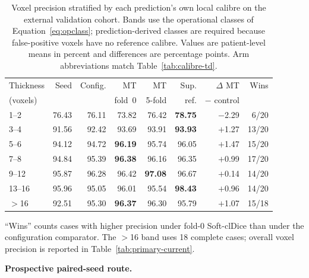 \begin{currentcontrolroute}
\begin{table}[htbp]
  \centering
  \footnotesize
  \setlength{\tabcolsep}{3pt}
  \caption[Voxel precision stratified by predicted airway calibre]{Voxel precision stratified by
  each prediction's own local calibre on the external validation cohort. Bands use the
  operational classes of Equation~\eqref{eq:opclass}; prediction-derived classes are required
  because false-positive voxels have no reference calibre. Values are patient-level means in
  percent and differences are percentage points. Arm abbreviations match
  Table~\ref{tab:calibre-td}.}
  \label{tab:calibre-precision}
  \begin{tabular}{lrrrrrrr}
    \toprule
    Thickness & Seed & Config. & MT & MT & Sup. & $\Delta$ MT & Wins \\
    (voxels) & & & fold~0 & 5-fold & ref. & $-$ control & \\
    \midrule
    1--2   & 76.43 & 76.11 & 73.82 & 76.42 & \textbf{78.75} & $-$2.29 &  6/20 \\
    3--4   & 91.56 & 92.42 & 93.69 & 93.91 & \textbf{93.93} & $+$1.27 & 13/20 \\
    5--6   & 94.12 & 94.72 & \textbf{96.19} & 95.74 & 96.05 & $+$1.47 & 15/20 \\
    7--8   & 94.84 & 95.39 & \textbf{96.38} & 96.16 & 96.35 & $+$0.99 & 17/20 \\
    9--12  & 95.87 & 96.28 & 96.42 & \textbf{97.08} & 96.67 & $+$0.14 & 14/20 \\
    13--16 & 95.96 & 95.05 & 96.01 & 95.54 & \textbf{98.43} & $+$0.96 & 14/20 \\
    $>$16  & 92.51 & 95.30 & \textbf{96.37} & 96.30 & 95.79 & $+$1.07 & 15/18 \\
    \bottomrule
  \end{tabular}
  \parbox{\linewidth}{\footnotesize ``Wins'' counts cases with higher precision under fold-0
  Soft-clDice than under the configuration comparator. The $>$16 band uses 18 complete cases;
  overall voxel precision is reported in Table~\ref{tab:primary-current}.}
\end{table}
\end{currentcontrolroute}
\fi

\ifshowpairedcontrol
\begin{pairedcontrolroute}
\noindent\textbf{Prospective paired-seed route.}
\end{pairedcontrolroute}
\fi

